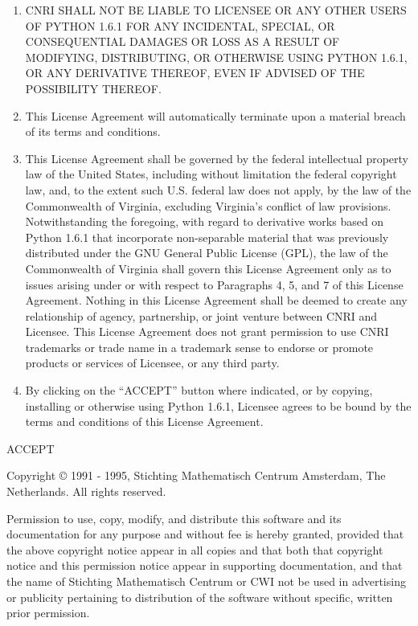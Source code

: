 \begin{enumerate}
\item
CNRI SHALL NOT BE LIABLE TO LICENSEE OR ANY OTHER USERS OF PYTHON
1.6.1 FOR ANY INCIDENTAL, SPECIAL, OR CONSEQUENTIAL DAMAGES OR LOSS AS
A RESULT OF MODIFYING, DISTRIBUTING, OR OTHERWISE USING PYTHON 1.6.1,
OR ANY DERIVATIVE THEREOF, EVEN IF ADVISED OF THE POSSIBILITY THEREOF.

\item
This License Agreement will automatically terminate upon a material
breach of its terms and conditions.

\item
This License Agreement shall be governed by the federal
intellectual property law of the United States, including without
limitation the federal copyright law, and, to the extent such
U.S. federal law does not apply, by the law of the Commonwealth of
Virginia, excluding Virginia's conflict of law provisions.
Notwithstanding the foregoing, with regard to derivative works based
on Python 1.6.1 that incorporate non-separable material that was
previously distributed under the GNU General Public License (GPL), the
law of the Commonwealth of Virginia shall govern this License
Agreement only as to issues arising under or with respect to
Paragraphs 4, 5, and 7 of this License Agreement.  Nothing in this
License Agreement shall be deemed to create any relationship of
agency, partnership, or joint venture between CNRI and Licensee.  This
License Agreement does not grant permission to use CNRI trademarks or
trade name in a trademark sense to endorse or promote products or
services of Licensee, or any third party.

\item
By clicking on the ``ACCEPT'' button where indicated, or by copying,
installing or otherwise using Python 1.6.1, Licensee agrees to be
bound by the terms and conditions of this License Agreement.
\end{enumerate}

\centerline{ACCEPT}



\centerline{}

Copyright \copyright{} 1991 - 1995, Stichting Mathematisch Centrum
Amsterdam, The Netherlands.  All rights reserved.

Permission to use, copy, modify, and distribute this software and its
documentation for any purpose and without fee is hereby granted,
provided that the above copyright notice appear in all copies and that
both that copyright notice and this permission notice appear in
supporting documentation, and that the name of Stichting Mathematisch
Centrum or CWI not be used in advertising or publicity pertaining to
distribution of the software without specific, written prior
permission.

